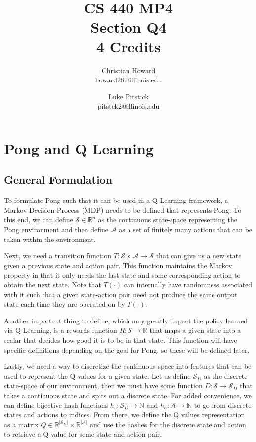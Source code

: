 \documentclass{article}[12pt]
\title{CS 440 MP4 \\ Section Q4 \\ 4 Credits}
\author{
Christian Howard \\ howard28@illinois.edu
\and
Luke Pitstick \\ pitstck2@illinois.edu
}
\date{} %
\begin{document}
   
   \maketitle
   \begin{abstract}
   \end{abstract}
   \newpage
   
   \tableofcontents
   \newpage
   
   \section{Pong and Q Learning} \label{sec:two}
   \subsection{General Formulation} \label{sec:pongform}
   To formulate Pong such that it can be used in a Q Learning framework, a Markov Decision Process (MDP) needs to be defined that represents Pong. To this end, we can define $\mathcal{S} \in \mathbb{R}^n$ as the continuous state-space representing the Pong environment and then define $\mathcal{A}$ as a set of finitely many actions that can be taken within the environment. 
   
   Next, we need a transition function $T: \mathcal{S} \times \mathcal{A} \rightarrow \mathcal{S}$ that can give us a new state given a previous state and action pair. This function maintains the Markov property in that it only needs the last state and some corresponding action to obtain the next state. Note that $T(\cdot)$ can internally have randomness associated with it such that a given state-action pair need not produce the same output state each time they are operated on by $T(\cdot)$.
   
   Another important thing to define, which may greatly impact the policy learned via Q Learning, is a rewards function $R: \mathcal{S} \rightarrow \mathbb{R}$ that maps a given state into a scalar that decides how good it is to be in that state. This function will have specific definitions depending on the goal for Pong, so these will be defined later.
   
   Lastly, we need a way to discretize the continuous space into features that can be used to represent the Q values for a given state. Let us define $\mathcal{S}_D$ as the discrete state-space of our environment, then we must have some function $D: \mathcal{S} \rightarrow \mathcal{S}_D$ that takes a continuous state and spits out a discrete state. For added convenience, we can define bijective hash functions $h_s: \mathcal{S}_D \rightarrow \mathbb{N}$ and $h_a: \mathcal{A} \rightarrow \mathbb{N}$ to go from discrete states and actions to indices. From there, we define the Q values representation as a matrix $Q \in \mathbb{R}^{|\mathcal{S}_D|} \times \mathbb{R}^{|\mathcal{A}|} $ and use the hashes for the discrete state and action to retrieve a Q value for some state and action pair.
   
\end{document}
